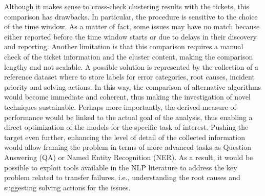 Although it makes sense to cross-check clustering results with the tickets, this comparison has drawbacks. 
In particular, the procedure is sensitive to the choice of the time window.
As a matter of fact, some issues may have no match because either reported before the time window starts or due to delays in their discovery and reporting. 
Another limitation is that this comparison requires a manual check of the ticket information and the cluster content, making the comparison lengthy and not scalable.
A possible solution is represented by the collection of a reference dataset where to store labels for error categories, root causes, incident priority and solving actions. 
In this way, the comparison of alternative algorithms would become immediate and coherent, thus making the investigation of novel techniques sustainable.
Perhaps more importantly, the derived measure of performance would be linked to the actual goal of the analysis, thus enabling a direct optimization of the models for the specific task of interest.
Pushing the target even further, enhancing the level of detail of the collected information would allow framing the problem in terms of more advanced tasks as Question Answering (QA) or Named Entity Recognition (NER). 
As a result, it would be possible to exploit tools available in the NLP literature to address the key problem related to transfer failures, i.e., understanding the root causes and suggesting solving actions for the issues.